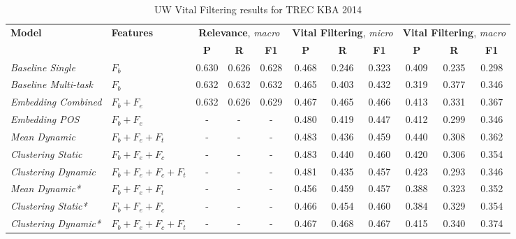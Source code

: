 \documentclass{article}
\begin{document}
\begin{table}[tb]
{\small
\begin{center}
\begin{tabular}{llccccccccc} 
\toprule
  \multirow{2}{*}{\textbf{Model}} & 
  \multirow{2}{*}{\textbf{Features}} & 
  \multicolumn{3}{c}{\textbf{Relevance}, \emph{macro}} & 
  \multicolumn{3}{c}{\textbf{Vital Filtering}, \emph{micro}} &
  \multicolumn{3}{c}{\textbf{Vital Filtering}, \emph{macro}}
\\ 
  \cmidrule(lr){3-5}
  \cmidrule(lr){6-8}
  \cmidrule(lr){9-11}
&   & 
  \textbf{P} & \textbf{R} & \textbf{F1} & 
  \textbf{P} & \textbf{R} & \textbf{F1} & 
  \textbf{P} & \textbf{R} & \textbf{F1} \\ 
\midrule
{\textit{Baseline Single}} & $F_b$ &
	0.630 & 0.626 & 0.628 & 
	0.468 & 0.246 & 0.323 &
  0.409 & 0.235 & 0.298 \\
{\textit{Baseline Multi-task}} & $F_b$ &
	0.632 & 0.632 & 0.632 & 
	0.465 & 0.403 & 0.432 &
	0.319 & 0.377 & 0.346 \\
{\textit{Embedding Combined}} & $F_b+F_e$ & 
	0.632 & 0.626 & 0.629 & 
	0.467 & 0.465 & 0.466 &
	0.413 & 0.331 & 0.367 \\
{\textit{Embedding POS}} & $F_b+F_e$ & 
	- & - & - & 
	0.480 & 0.419 & 0.447 &
	0.412 & 0.299 & 0.346 \\
{\textit{Mean Dynamic}} & $F_b+F_e+F_t$ & 
	- & - & - & 
	0.483 & 0.436 & 0.459 &
	0.440 & 0.308 & 0.362 \\
{\textit{Clustering Static}} & $F_b+F_e+F_c$ & 
	- & - & - & 
	0.483 & 0.440 & 0.460 &
	0.420 & 0.306 & 0.354 \\
{\textit{Clustering Dynamic}} & $F_b+F_e+F_c+F_t$ & 
	- & - & - & 
  0.481 & 0.435 & 0.457 &
	0.423 & 0.293 & 0.346 \\
\midrule
{\textit{Mean Dynamic*}} & $F_b+F_e+F_t$ & 
  - & - & - & 
  0.456 & 0.459 & 0.457 &
  0.388 & 0.323 & 0.352 \\
{\textit{Clustering Static*}} & $F_b+F_e+F_c$ & 
  - & - & - & 
  0.466 & 0.454 & 0.460 &
  0.384 & 0.329 & 0.354 \\
{\textit{Clustering Dynamic*}} & $F_b+F_e+F_c+F_t$ & 
  - & - & - & 
  0.467 & 0.468 & 0.467 &
  0.415 & 0.340 & 0.374 \\ 
\bottomrule
\end{tabular}
\end{center}
}
\caption{UW Vital Filtering results for TREC KBA 2014}
\label{resMacro}
\end{table}
\end{document}
